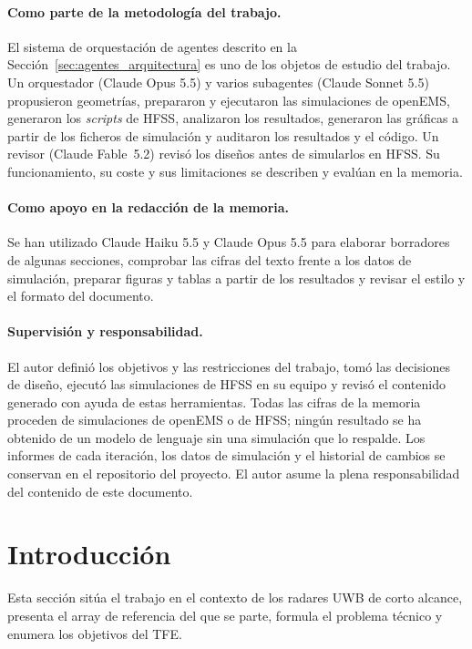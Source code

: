\documentclass[11pt,a4paper]{article}
\begin{document}
\paragraph{Como parte de la metodología del trabajo.} El sistema de orquestación de agentes descrito
en la Sección~\ref{sec:agentes_arquitectura} es uno de los objetos de estudio del trabajo. Un
orquestador (Claude Opus 5.5) y varios subagentes (Claude Sonnet 5.5) propusieron geometrías,
prepararon y ejecutaron las simulaciones de openEMS, generaron los \textit{scripts} de HFSS,
analizaron los resultados, generaron las gráficas a partir de los ficheros de simulación y
auditaron los resultados y el código. Un revisor (Claude Fable~5.2) revisó los diseños antes de
simularlos en HFSS. Su funcionamiento, su coste y sus limitaciones se describen y evalúan en la
memoria.

\paragraph{Como apoyo en la redacción de la memoria.} Se han utilizado Claude Haiku 5.5 y Claude
Opus 5.5 para elaborar borradores de algunas secciones, comprobar las cifras del texto frente a los
datos de simulación, preparar figuras y tablas a partir de los resultados y revisar el estilo y el
formato del documento.

\paragraph{Supervisión y responsabilidad.} El autor definió los objetivos y las restricciones del
trabajo, tomó las decisiones de diseño, ejecutó las simulaciones de HFSS en su equipo y revisó el
contenido generado con ayuda de estas herramientas. Todas las cifras de la memoria proceden de
simulaciones de openEMS o de HFSS; ningún resultado se ha obtenido de un modelo de lenguaje sin una
simulación que lo respalde. Los informes de cada iteración, los datos de simulación y el historial
de cambios se conservan en el repositorio del proyecto. El autor asume la plena responsabilidad del
contenido de este documento.

\newpage
\tableofcontents

\newpage
\listoffigures

\newpage
\listoftables

\newpage
\section{Introducción}\label{sec:introduccion}
Esta sección sitúa el trabajo en el contexto de los radares UWB de corto alcance, presenta el
array de referencia del que se parte, formula el problema técnico y enumera los objetivos del TFE.
\end{document}
